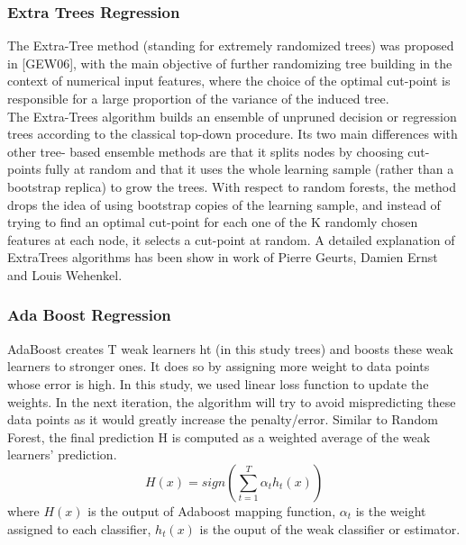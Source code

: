 \documentclass[english]{article}
\begin{document}
\subsubsection{Extra Trees Regression}
The Extra-Tree method (standing for extremely randomized trees) was proposed in [GEW06], with the main objective of further randomizing tree building in the context of numerical input features, where the choice of the optimal cut-point is responsible for a large proportion of the variance of the induced tree.\\
The Extra-Trees algorithm builds an ensemble of unpruned decision or regression trees according to the classical top-down procedure. Its two main differences with other tree- based ensemble methods are that it splits nodes by choosing cut-points fully at random and that it uses the whole learning sample (rather than a bootstrap replica) to grow the trees. With respect to random forests, the method drops the idea of using bootstrap copies of the learning sample, and instead of trying to find an optimal cut-point for each one of the K randomly chosen features at each node, it selects a cut-point at random. A detailed explanation of ExtraTrees algorithms has been show in work of Pierre Geurts, Damien Ernst and Louis Wehenkel\cite{Extre}.
\subsubsection{Ada Boost Regression}
AdaBoost creates T weak learners ht (in this study trees) and boosts these weak learners to stronger ones. It does so by assigning more weight to data points whose error is high. In this study, we used linear loss function to update the weights. In the next iteration, the algorithm will try to avoid mispredicting these data points as it would greatly increase the penalty/error. Similar to Random Forest, the final prediction H is computed as a weighted average of the weak learners’ prediction.\cite{Ristanto}
\begin{equation}
H(x) = sign(\sum_{t=1}^{T}\alpha_{t}h_{t}(x))
\end{equation}
where $H(x)$ is the output of Adaboost mapping function, $\alpha_{t}$ is the weight assigned to each classifier, $h_{t}(x)$ is the ouput of the weak classifier or estimator.\cite{Hastie}
\end{document}

